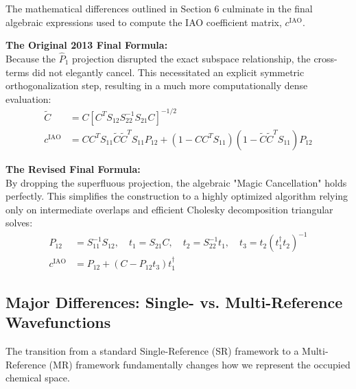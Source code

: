 \documentclass[11pt]{article}
\begin{document}
The mathematical differences outlined in Section 6 culminate in the final algebraic expressions used to compute the IAO coefficient matrix, $c^{\text{IAO}}$. 

\textbf{The Original 2013 Final Formula:} \\
Because the $\hat{P}_1$ projection disrupted the exact subspace relationship, the cross-terms did not elegantly cancel. This necessitated an explicit symmetric orthogonalization step, resulting in a much more computationally dense evaluation:
\begin{align}
    \tilde{C} &= C [C^T S_{12} S_{22}^{-1} S_{21} C]^{-1/2} \\
    c^{\text{IAO}} &= C C^T S_{11} \tilde{C} \tilde{C}^T S_{11} P_{12} + (1 - C C^T S_{11})(1 - \tilde{C} \tilde{C}^T S_{11}) P_{12}
\end{align}

\textbf{The Revised Final Formula:} \\
By dropping the superfluous projection, the algebraic "Magic Cancellation" holds perfectly. This simplifies the construction to a highly optimized algorithm relying only on intermediate overlaps and efficient Cholesky decomposition triangular solves:
\begin{align}
    P_{12} &= S_{11}^{-1}S_{12}, \quad t_1 = S_{21} C, \quad t_2 = S_{22}^{-1} t_1, \quad t_3 = t_2 (t_1^\dagger t_2)^{-1} \\
    c^{\text{IAO}} &= P_{12} + (C - P_{12}t_3)t_1^\dagger
\end{align}

\subsection{Major Differences: Single- vs. Multi-Reference Wavefunctions}

The transition from a standard Single-Reference (SR) framework to a Multi-Reference (MR) framework fundamentally changes how we represent the occupied chemical space. 
\end{document}
